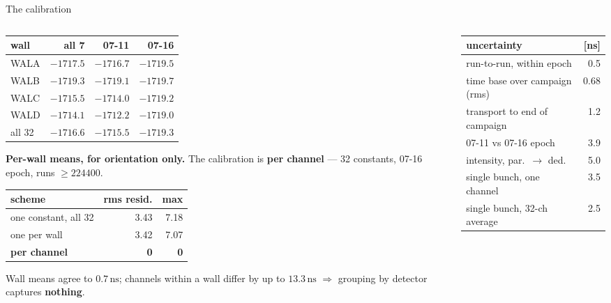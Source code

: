 \documentclass[aspectratio=169,10pt]{beamer}
\newcommand{\ns}{\,\mathrm{ns}}
\newcommand{\hl}[1]{\textcolor{orange!75!black}{\textbf{#1}}}
\begin{document}
\begin{frame}{The calibration}
\begin{columns}[T]
\begin{column}{0.52\textwidth}
\small
\begin{tabular}{lrrr}
\toprule
wall & all 7 & 07-11 & \textbf{07-16} \\
\midrule
WALA & $-1717.5$ & $-1716.7$ & $\mathbf{-1719.5}$ \\
WALB & $-1719.3$ & $-1719.1$ & $\mathbf{-1719.7}$ \\
WALC & $-1715.5$ & $-1714.0$ & $\mathbf{-1719.2}$ \\
WALD & $-1714.1$ & $-1712.2$ & $\mathbf{-1719.0}$ \\
\midrule
all 32 & $-1716.6$ & $-1715.5$ & $\mathbf{-1719.3}$ \\
\bottomrule
\end{tabular}
\vspace{0.8em}

{\footnotesize \hl{Per-wall means, for orientation only.} The calibration is
\textbf{per channel} --- 32 constants, 07-16 epoch, runs $\ge224400$.}
\vspace{0.4em}

{\footnotesize
\begin{tabular}{lrr}
\toprule
scheme & rms resid. & max \\
\midrule
one constant, all 32 & 3.43 & 7.18 \\
one per wall & 3.42 & 7.07 \\
\textbf{per channel} & \textbf{0} & \textbf{0} \\
\bottomrule
\end{tabular}}
\vspace{0.3em}

{\footnotesize Wall means agree to $0.7\ns$; channels within a wall differ by up
to $13.3\ns$ $\Rightarrow$ grouping by detector captures \hl{nothing}.}
\end{column}
\begin{column}{0.48\textwidth}
\small
\begin{tabular}{lr}
\toprule
uncertainty & [ns] \\
\midrule
run-to-run, within epoch & 0.5 \\
time base over campaign (rms) & 0.68 \\
transport to end of campaign & 1.2 \\
07-11 vs 07-16 epoch & 3.9 \\
intensity, par.\ $\to$ ded. & 5.0 \\
\midrule
single bunch, one channel & 3.5 \\
single bunch, 32-ch average & 2.5 \\
\bottomrule
\end{tabular}
\end{column}
\end{columns}
\end{frame}
\end{document}
